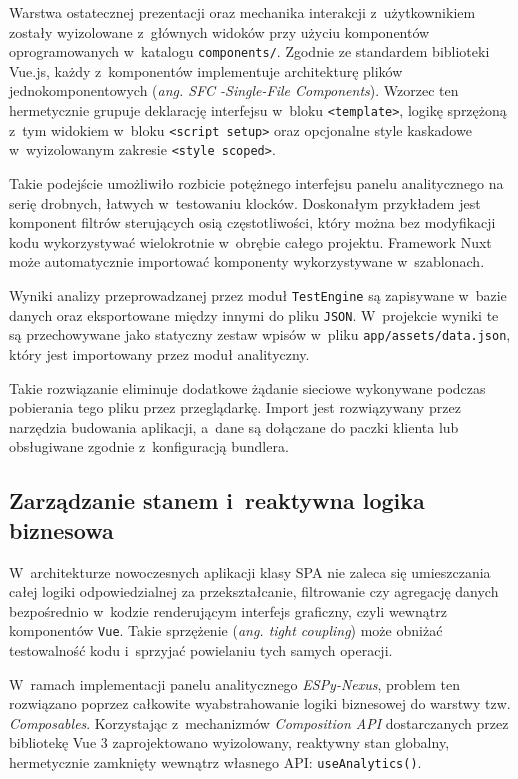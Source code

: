 Warstwa ostatecznej prezentacji oraz mechanika interakcji z~użytkownikiem zostały wyizolowane z~głównych widoków przy użyciu komponentów oprogramowanych w~katalogu \texttt{components/}.
Zgodnie ze standardem biblioteki Vue.js, każdy z~komponentów implementuje architekturę plików jednokomponentowych (\textit{ang. SFC -Single-File Components}).
Wzorzec ten hermetycznie grupuje deklarację interfejsu w~bloku \texttt{<template>}, logikę sprzężoną z~tym widokiem w~bloku \texttt{<script setup>} oraz opcjonalne style kaskadowe w~wyizolowanym zakresie \texttt{<style scoped>}.

Takie podejście umożliwiło rozbicie potężnego interfejsu panelu analitycznego na serię drobnych, łatwych w~testowaniu klocków.
Doskonałym przykładem jest komponent filtrów sterujących osią częstotliwości, który można bez modyfikacji kodu wykorzystywać wielokrotnie w~obrębie całego projektu.
Framework Nuxt może automatycznie importować komponenty wykorzystywane w~szablonach.

Wyniki analizy przeprowadzanej przez moduł \texttt{TestEngine} są zapisywane w~bazie danych oraz eksportowane między innymi do pliku \texttt{JSON}.
W~projekcie wyniki te są przechowywane jako statyczny zestaw wpisów w~pliku \texttt{app/assets/data.json}, który jest importowany przez moduł analityczny.

Takie rozwiązanie eliminuje dodatkowe żądanie sieciowe wykonywane podczas pobierania tego pliku przez przeglądarkę.
Import jest rozwiązywany przez narzędzia budowania aplikacji, a~dane są dołączane do paczki klienta lub obsługiwane zgodnie z~konfiguracją bundlera.

\subsection{Zarządzanie stanem i~reaktywna logika biznesowa}
\label{subsec:zarzadzanie-stanem-i-reaktywna-logika-biznesowa}

W~architekturze nowoczesnych aplikacji klasy SPA nie zaleca się umieszczania całej logiki odpowiedzialnej za przekształcanie, filtrowanie czy agregację danych bezpośrednio w~kodzie renderującym interfejs graficzny, czyli wewnątrz komponentów \texttt{Vue}.
Takie sprzężenie (\textit{ang. tight coupling}) może obniżać testowalność kodu i~sprzyjać powielaniu tych samych operacji.

W~ramach implementacji panelu analitycznego \textit{ESPy-Nexus}, problem ten rozwiązano poprzez całkowite wyabstrahowanie logiki biznesowej do warstwy tzw. \textit{Composables}.
Korzystając z~mechanizmów \textit{Composition API} dostarczanych przez bibliotekę Vue 3 zaprojektowano wyizolowany, reaktywny stan globalny, hermetycznie zamknięty wewnątrz własnego API: \texttt{useAnalytics()}.

